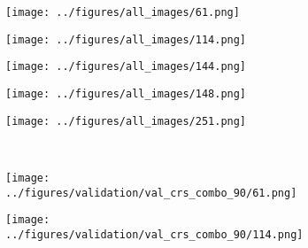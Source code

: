 \begin{figure}[h!]
	\centering
	\begin{subfigure}[b]{0.03\textwidth} %
		\centering
	\end{subfigure}
	\hspace{0.2cm}
	\begin{subfigure}{0.18\textwidth}
		\centering
		\texttt{[image: ../figures/all\_images/61.png]}
		\label{fig:1}
	\end{subfigure}
	\begin{subfigure}{0.18\textwidth}
		\centering
		\texttt{[image: ../figures/all\_images/114.png]}
		\label{fig:1}
	\end{subfigure}
	\begin{subfigure}{0.18\textwidth}
		\centering
		\texttt{[image: ../figures/all\_images/144.png]}
		\label{fig:1}
	\end{subfigure}
	\begin{subfigure}{0.18\textwidth}
		\centering
		\texttt{[image: ../figures/all\_images/148.png]}
		\label{fig:1}
	\end{subfigure}
	\begin{subfigure}{0.18\textwidth}
		\centering
		\texttt{[image: ../figures/all\_images/251.png]}
		\label{fig:1}
	\end{subfigure}
	\vspace{-0.35cm}
	\\
		\begin{subfigure}[b]{0.03\textwidth} %
		\centering
	\end{subfigure}
	\hspace{0.2cm}
	\begin{subfigure}{0.18\textwidth}
		\centering
		\texttt{[image: ../figures/validation/val\_crs\_combo\_90/61.png]}
		\label{fig:1}
	\end{subfigure}
	\begin{subfigure}{0.18\textwidth}
		\centering
		\texttt{[image: ../figures/validation/val\_crs\_combo\_90/114.png]}
		\label{fig:1}
	\end{subfigure}
	\begin{subfigure}{0.18\textwidth}

\end{subfigure}
\end{figure}
